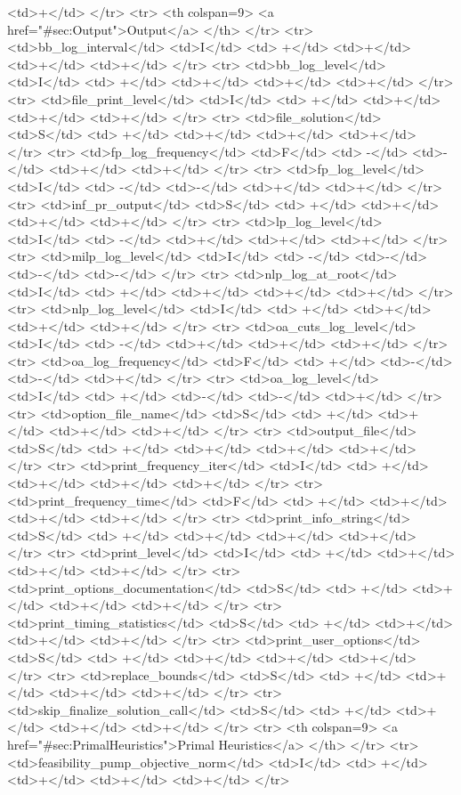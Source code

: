 {{<td>+</td>
</tr>
<tr>   <th colspan=9> <a href="#sec:Output">Output</a> </th>
</tr>
<tr>
<td>bb_log_interval</td>
<td>I</td>
<td> +</td>
<td>+</td>
<td>+</td>
<td>+</td>
</tr>
<tr>
<td>bb_log_level</td>
<td>I</td>
<td> +</td>
<td>+</td>
<td>+</td>
<td>+</td>
</tr>
<tr>
<td>file_print_level</td>
<td>I</td>
<td> +</td>
<td>+</td>
<td>+</td>
<td>+</td>
</tr>
<tr>
<td>file_solution</td>
<td>S</td>
<td> +</td>
<td>+</td>
<td>+</td>
<td>+</td>
</tr>
<tr>
<td>fp_log_frequency</td>
<td>F</td>
<td> -</td>
<td>-</td>
<td>+</td>
<td>+</td>
</tr>
<tr>
<td>fp_log_level</td>
<td>I</td>
<td> -</td>
<td>-</td>
<td>+</td>
<td>+</td>
</tr>
<tr>
<td>inf_pr_output</td>
<td>S</td>
<td> +</td>
<td>+</td>
<td>+</td>
<td>+</td>
</tr>
<tr>
<td>lp_log_level</td>
<td>I</td>
<td> -</td>
<td>+</td>
<td>+</td>
<td>+</td>
</tr>
<tr>
<td>milp_log_level</td>
<td>I</td>
<td> -</td>
<td>-</td>
<td>-</td>
<td>-</td>
</tr>
<tr>
<td>nlp_log_at_root</td>
<td>I</td>
<td> +</td>
<td>+</td>
<td>+</td>
<td>+</td>
</tr>
<tr>
<td>nlp_log_level</td>
<td>I</td>
<td> +</td>
<td>+</td>
<td>+</td>
<td>+</td>
</tr>
<tr>
<td>oa_cuts_log_level</td>
<td>I</td>
<td> -</td>
<td>+</td>
<td>+</td>
<td>+</td>
</tr>
<tr>
<td>oa_log_frequency</td>
<td>F</td>
<td> +</td>
<td>-</td>
<td>-</td>
<td>+</td>
</tr>
<tr>
<td>oa_log_level</td>
<td>I</td>
<td> +</td>
<td>-</td>
<td>-</td>
<td>+</td>
</tr>
<tr>
<td>option_file_name</td>
<td>S</td>
<td> +</td>
<td>+</td>
<td>+</td>
<td>+</td>
</tr>
<tr>
<td>output_file</td>
<td>S</td>
<td> +</td>
<td>+</td>
<td>+</td>
<td>+</td>
</tr>
<tr>
<td>print_frequency_iter</td>
<td>I</td>
<td> +</td>
<td>+</td>
<td>+</td>
<td>+</td>
</tr>
<tr>
<td>print_frequency_time</td>
<td>F</td>
<td> +</td>
<td>+</td>
<td>+</td>
<td>+</td>
</tr>
<tr>
<td>print_info_string</td>
<td>S</td>
<td> +</td>
<td>+</td>
<td>+</td>
<td>+</td>
</tr>
<tr>
<td>print_level</td>
<td>I</td>
<td> +</td>
<td>+</td>
<td>+</td>
<td>+</td>
</tr>
<tr>
<td>print_options_documentation</td>
<td>S</td>
<td> +</td>
<td>+</td>
<td>+</td>
<td>+</td>
</tr>
<tr>
<td>print_timing_statistics</td>
<td>S</td>
<td> +</td>
<td>+</td>
<td>+</td>
<td>+</td>
</tr>
<tr>
<td>print_user_options</td>
<td>S</td>
<td> +</td>
<td>+</td>
<td>+</td>
<td>+</td>
</tr>
<tr>
<td>replace_bounds</td>
<td>S</td>
<td> +</td>
<td>+</td>
<td>+</td>
<td>+</td>
</tr>
<tr>
<td>skip_finalize_solution_call</td>
<td>S</td>
<td> +</td>
<td>+</td>
<td>+</td>
<td>+</td>
</tr>
<tr>   <th colspan=9> <a href="#sec:PrimalHeuristics">Primal Heuristics</a> </th>
</tr>
<tr>
<td>feasibility_pump_objective_norm</td>
<td>I</td>
<td> +</td>
<td>+</td>
<td>+</td>
<td>+</td>
</tr>
}}
